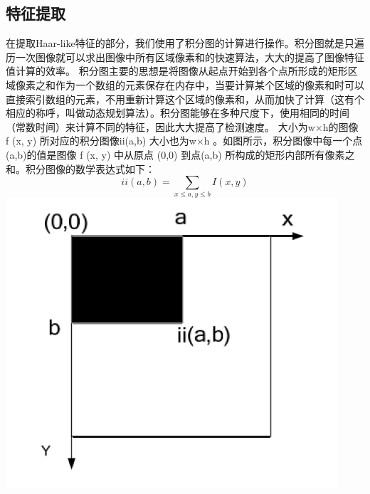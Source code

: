 \documentclass[12pt]{report}
\begin{document}
\subsection{特征提取}
在提取Haar-like特征的部分，我们使用了积分图的计算进行操作。积分图就是只遍历一次图像就可以求出图像中所有区域像素和的快速算法，大大的提高了图像特征值计算的效率。
\newline\newline
积分图主要的思想是将图像从起点开始到各个点所形成的矩形区域像素之和作为一个数组的元素保存在内存中，当要计算某个区域的像素和时可以直接索引数组的元素，不用重新计算这个区域的像素和，从而加快了计算（这有个相应的称呼，叫做动态规划算法）。积分图能够在多种尺度下，使用相同的时间（常数时间）来计算不同的特征，因此大大提高了检测速度。
\newline\newline
大小为w×h的图像 f (x, y) 所对应的积分图像ii(a,b) 大小也为w×h 。如图所示，积分图像中每一个点 (a,b)的值是图像 f (x, y) 中从原点 (0,0) 到点(a,b) 所构成的矩形内部所有像素之和。积分图像的数学表达式如下：$$i i(a, b)=\sum_{x \leq a, y \leq b} I(x, y)$$
\newline
\includegraphics[scale=0.4]{ig.png}
\end{document}

